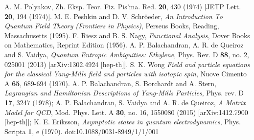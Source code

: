 \begin{thebibliography}{99}
A. M. Polyakov, Zh. Eksp. Teor. Fiz. Pis'ma. Red. \textbf{20}, 430 (1974) [JETP Lett. \textbf{20}, 194 (1974)].
 M. E. Peshkin and D. V. Schr\"oeder, \textit{An Introduction To Quantum Field Theory (Frontiers in Physics)}, Perseus Books, Reading, Massachusetts (1995).
 F. Riesz and B. S. Nagy, \textit{Functional Analysis}, Dover Books on Mathematics, Reprint Edition (1956).
 A. P. Balachandran, A. R. de Queiroz and S. Vaidya, \textit{Quantum Entropic Ambiguities: Ethylene}, Phys. Rev. D \textbf{88}, no. 2, 025001 (2013) [arXiv:1302.4924 [hep-th]].
 S. K. Wong \textit{Field and particle equations for the classical Yang-Mills field and particles with isotopic spin}, Nuove Cimento A \textbf{65}, 689-694 (1970).
 A. P. Balachandran, S. Borchardt and A. Stern, \textit{Lagrangian and Hamiltonian Descriptions of Yang-Mills Particles}, Phys. rev. D \textbf{17}, 3247 (1978);
 A. P. Balachandran, S. Vaidya and A. R. de Queiroz, \textit{A Matrix Model for QCD}, Mod. Phys. Lett. A \textbf{30}, no. 16, 1550080 (2015) [arXiv:1412.7900 [hep-th]];
 K. E. Eriksson, \textit{Asymptotic states in quantum electrodynamics}, Phys. Scripta \textbf{1}, e (1970). doi:10.1088/0031-8949/1/1/001
\end{thebibliography}









